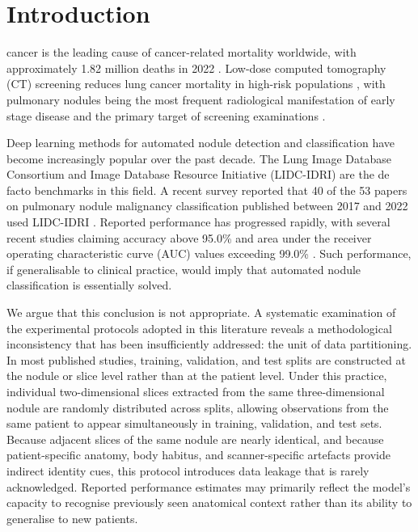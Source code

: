 \documentclass{ieeeaccess}
\begin{document}
\section{Introduction}
\label{sec:introduction}
 cancer is the leading cause of cancer-related mortality worldwide, with approximately 1.82 million deaths in 2022 \cite{bray2024}. Low-dose computed tomography (CT) screening reduces lung cancer mortality in high-risk populations \cite{aberle2011}, with pulmonary nodules being the most frequent radiological manifestation of early stage disease and the primary target of screening examinations \cite{macmahon2017,pedrosa2021}.

Deep learning methods for automated nodule detection and classification have become increasingly popular over the past decade. The Lung Image Database Consortium and Image Database Resource Initiative (LIDC-IDRI) \cite{armato2011} are the de facto benchmarks in this field. A recent survey reported that 40 of the 53 papers on pulmonary nodule malignancy classification published between 2017 and 2022 used LIDC-IDRI \cite{lei2022}. Reported performance has progressed rapidly, with several recent studies claiming accuracy above 95.0\% and area under the receiver operating characteristic curve (AUC) values exceeding 99.0\% \cite{liu2024,dhayalini2026,xu2020,zhang2024}. Such performance, if generalisable to clinical practice, would imply that automated nodule classification is essentially solved.

We argue that this conclusion is not appropriate. A systematic examination of the experimental protocols adopted in this literature reveals a methodological inconsistency that has been insufficiently addressed: the unit of data partitioning. In most published studies, training, validation, and test splits are constructed at the nodule or slice level rather than at the patient level. Under this practice, individual two-dimensional slices extracted from the same three-dimensional nodule are randomly distributed across splits, allowing observations from the same patient to appear simultaneously in training, validation, and test sets. Because adjacent slices of the same nodule are nearly identical, and because patient-specific anatomy, body habitus, and scanner-specific artefacts provide indirect identity cues, this protocol introduces data leakage that is rarely acknowledged. Reported performance estimates may primarily reflect the model's capacity to recognise previously seen anatomical context rather than its ability to generalise to new patients.
\end{document}
